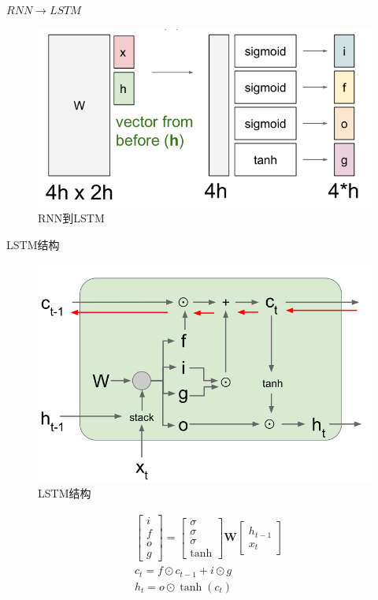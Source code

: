 \documentclass{article}
\begin{document}
$RNN\rightarrow LSTM$
\begin{figure}[H]
\centering
\includegraphics[scale=0.4]{figure/RNN2LSTM.PNG}
\caption{RNN到LSTM}
\label{fig:17}
\end{figure}
LSTM结构
\begin{figure}[H]
\centering
\includegraphics[scale=0.5]{figure/LSTM.PNG}
\caption{LSTM结构}
\label{fig:18}
\end{figure}
\begin{equation}\label{eq:5}
\begin{split}
&\begin{bmatrix}i\\f\\o\\g\end{bmatrix}=\begin{bmatrix}\sigma\\\sigma\\\sigma\\\tanh\end{bmatrix}\mathbf{W}\begin{bmatrix}h_{t-1}\\x_t\end{bmatrix}\\
&c_t = f\odot c_{t-1}+i\odot g\\
&h_t = o\odot\tanh(c_t)
\end{split}
\end{equation}
\end{document}
